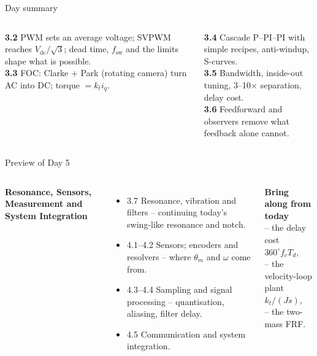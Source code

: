 \documentclass[aspectratio=169,10pt]{beamer}
\begin{document}
\begin{frame}[t]{Day summary}
\begin{columns}[T,onlytextwidth]
\begin{defbox}
\small
\textbf{3.2} PWM sets an average voltage; SVPWM reaches $V_\text{dc}/\sqrt3$; dead time, $f_\text{sw}$ and the limits shape what is possible.\\[1mm]
\textbf{3.3} FOC: Clarke + Park (rotating camera) turn AC into DC; torque $=k_ti_q$.
\end{defbox}
\begin{defbox}
\small
\textbf{3.4} Cascade P--PI--PI with simple recipes, anti-windup, S-curves.\\[1mm]
\textbf{3.5} Bandwidth, inside-out tuning, 3--10$\times$ separation, delay cost.\\[1mm]
\textbf{3.6} Feedforward and observers remove what feedback alone cannot.
\end{defbox}
\end{columns}
\vspace{3mm}
\centering
{}
\end{frame}

\begin{frame}[t]{Preview of Day 5}
\begin{columns}[T,onlytextwidth]
\textbf{Resonance, Sensors, Measurement and System Integration}
\begin{itemize}\small
\item 3.7 Resonance, vibration and filters -- continuing today's swing-like resonance and notch.
\item 4.1--4.2 Sensors; encoders and resolvers -- where $\theta_m$ and $\omega$ come from.
\item 4.3--4.4 Sampling and signal processing -- quantisation, aliasing, filter delay.
\item 4.5 Communication and system integration.
\end{itemize}
\begin{notebox}
\textbf{Bring along from today}\\
-- the delay cost $360^\circ f_cT_d$,\\
-- the velocity-loop plant $k_t/(Js)$,\\
-- the two-mass FRF.
\end{notebox}
\end{columns}
\end{frame}
\end{document}
